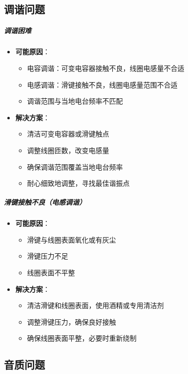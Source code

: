 \documentclass[12pt,UTF8]{ctexbook}
\begin{document}
\subsection{调谐问题}

\subparagraph{调谐困难}

\begin{itemize}[leftmargin=3.5em]
    \item \textbf{可能原因}：
    \begin{itemize}
        \item 电容调谐：可变电容器接触不良，线圈电感量不合适
        \item 电感调谐：滑键接触不良，线圈电感量范围不合适
        \item 调谐范围与当地电台频率不匹配
    \end{itemize}
    \item \textbf{解决方案}：
    \begin{itemize}
        \item 清洁可变电容器或滑键触点
        \item 调整线圈匝数，改变电感量
        \item 确保调谐范围覆盖当地电台频率
        \item 耐心细致地调整，寻找最佳谐振点
    \end{itemize}
\end{itemize}

\subparagraph{滑键接触不良（电感调谐）}

\begin{itemize}[leftmargin=3.5em]
    \item \textbf{可能原因}：
    \begin{itemize}
        \item 滑键与线圈表面氧化或有灰尘
        \item 滑键压力不足
        \item 线圈表面不平整
    \end{itemize}
    \item \textbf{解决方案}：
    \begin{itemize}
        \item 清洁滑键和线圈表面，使用酒精或专用清洁剂
        \item 调整滑键压力，确保良好接触
        \item 确保线圈表面平整，必要时重新绕制
    \end{itemize}
\end{itemize}

\subsection{音质问题}
\end{document}
